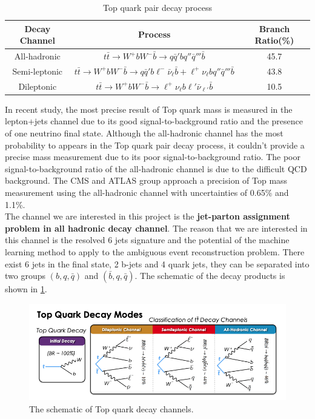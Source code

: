 \begin{center}
\begin{table}[h]
\begin{tabular}{ c c c}
	\cline{1-3}
	Decay Channel    & Process & Branch Ratio(\%) \\
	\hline
	All-hadronic      & $t\bar{t}\to W^{+}bW^{-}\bar{b}\to q\bar{q}'bq''\bar{q}'''\bar{b}$    & 45.7     \\
	Semi-leptonic       &   $t\bar{t}\to W^{+}bW^{-}\bar{b}\to q\bar{q}'b\ell^{-}\bar{\nu}_{\ell}\bar{b} + \ell^{+}\nu_{\ell}bq''\bar{q}'''\bar{b}$   & 43.8     \\
	Dileptonic      &   $t\bar{t}\to W^{+}bW^{-}\bar{b}\to \ell^{+}\nu_{\ell}b\ell'\bar{\nu}_{\ell'}\bar{b}$   & 10.5      \\
	\hline
\end{tabular}
\caption{Top quark pair decay process\cite{Zyla:2020zbs}}
\label{table:Branchratio}
\end{table}
\end{center}
In recent study, the most precise result of Top quark mass is measured in the lepton+jets channel due to its good signal-to-background ratio and the presence of one neutrino final state.\cite{Mccarthy:2015ucy} Although the all-hadronic channel has the most probability to appears in the Top quark pair decay process, it couldn't provide a precise mass measurement due to its poor signal-to-background ratio. The poor signal-to-background ratio of the all-hadronic channel is due to the difficult QCD background. The CMS and ATLAS group approach a precision of Top mass measurement using the all-hadronic channel with uncertainties of 0.65\% and 1.1\%.\cite{Sirunyan:2018mlv}\cite{Aaboud:2017mae} 
\\
\newline
The channel we are interested in this project is the \textbf{jet-parton assignment problem in all hadronic decay channel}. The reason that we are interested in this channel is the resolved 6 jets signature and the potential of the machine learning method to apply to the ambiguous event reconstruction problem. There exist 6 jets in the final state, 2 b-jets and 4 quark jets, they can be separated into two groups $\left(b, q, \bar{q}\right)$ and $\left(\bar{b}, q, \bar{q}\right)$. The schematic of the decay products is shown in \ref{fig:ttbardecaymode}. 
\begin{figure}[h]
	\centering
	\includegraphics[width=0.8\linewidth]{Figures/ttbar-decay-mode.png}
	\caption{The schematic of Top quark decay channels.\cite{Mccarthy:2015ucy}}
	\label{fig:ttbardecaymode}
\end{figure}
